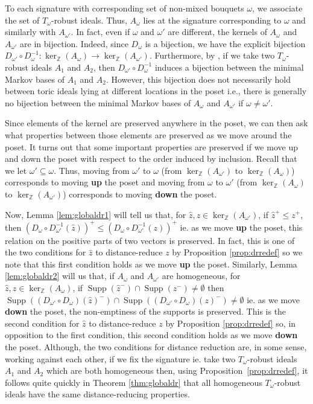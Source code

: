 \documentclass[a4paper, 12pt]{article}
\newcommand{\ZZ}{\mathbb Z}
\theoremstyle{plain}
\theoremstyle{definition}
\theoremstyle{remark}
\begin{document}
To each signature with corresponding set of non-mixed bouquets $\omega$, we associate the set of $T_{\omega}$-robust ideals. Thus, $A_{\omega}$ lies at the signature corresponding to $\omega$ and similarly with $A_{\omega'}$. In fact, even if $\omega$ and $\omega'$ are different, the kernels of $A_{\omega}$ and $A_{\omega'}$ are in bijection. Indeed, since $D_{\omega}$ is a bijection, we have the explicit bijection $D_{\omega'} \circ D_{\omega}^{-1}:\ker_\ZZ(A_{\omega}) \rightarrow \ker_\ZZ(A_{\omega'})$. Furthermore, by \cite[Theorem 2.2]{kosta2023strongly}, if we take two $T_{\omega}$-robust ideals $A_1$ and $A_2$, then $D_{\omega'} \circ D_{\omega}^{-1}$ induces a bijection between the minimal Markov bases of $A_1$ and $A_2$. However, this bijection does not necessarily hold between toric ideals lying at different locations in the poset i.e., there is generally no bijection between the minimal Markov bases of $A_{\omega}$ and $A_{\omega'}$ if $\omega \neq \omega'$. 

Since elements of the kernel are preserved anywhere in the poset, we can then ask what properties between those elements are preserved as we move around the poset. It turns out that some important properties are preserved if we move up and down the poset with respect to the order induced by inclusion. Recall that we let $\omega' \subseteq \omega$. Thus, moving from $\omega'$ to $\omega$ (from $\ker_\ZZ(A_{\omega'})$ to $\ker_\ZZ(A_{\omega})$) corresponds to moving \textbf{up} the poset and moving from $\omega$ to $\omega'$ (from $\ker_\ZZ(A_{\omega})$ to $\ker_\ZZ(A_{\omega'})$) corresponds to moving \textbf{down} the poset. 

Now, Lemma \ref{lem:globaldr1} will tell us that, for $\hat z,z \in \ker_\ZZ(A_{\omega'})$, if $\hat z^+ \le z^+$, then $(D_{\omega} \circ D_{\omega'}^{-1}(\hat z))^+ \le (D_{\omega} \circ D_{\omega'}^{-1}( z))^+$ ie. as we move \textbf{up} the poset, this relation on the positive parts of two vectors is preserved. In fact, this is one of the two conditions for $\hat z$ to distance-reduce $z$ by Proposition \ref{prop:drredef} so we note that this first condition holds as we move \textbf{up} the poset. Similarly, Lemma \ref{lem:globaldr2} will us that, if $A_\omega$ and $A_{\omega'}$ are homogeneous, for $\hat z,z \in \ker_\ZZ(A_{\omega})$, if $\operatorname{Supp}(\hat z^-) \cap \operatorname{Supp}(z^-) \neq \emptyset$ then $\operatorname{Supp}((D_{\omega'}\circ D_{\omega})(\hat z)^-) \cap \operatorname{Supp}((D_{\omega'}\circ D_{\omega})(z)^-) \neq \emptyset$ ie. as we move \textbf{down} the poset, the non-emptiness of the supports is preserved. This is the second condition for $\hat z$ to distance-reduce $z$ by Proposition \ref{prop:drredef} so, in opposition to the first condition, this second condition holds as we move \textbf{down} the poset. Although, the two conditions for distance reduction are, in some sense, working against each other, if we fix the signature ie. take two $T_{\omega}$-robust ideals $A_1$ and $A_2$ which are both homogeneous then, using Proposition~\ref{prop:drredef}, it follows quite quickly in Theorem \ref{thm:globaldr} that all homogeneous $T_{\omega}$-robust ideals have the same distance-reducing properties.
\end{document}
